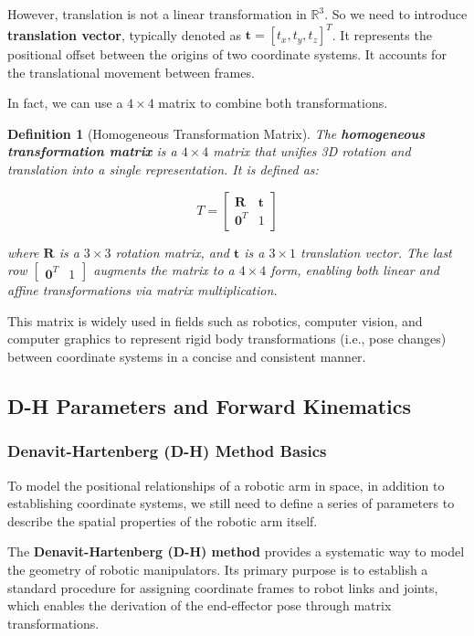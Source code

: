 \documentclass[conference]{IEEEtran}
\newtheorem{definition}{Definition}
\begin{document}
However, translation is not a linear transformation in $\mathbb{R}^3$. So we need to introduce \textbf{translation vector}, typically denoted as $\mathbf{t} = [t_x, t_y, t_z]^T$. It represents the positional offset between the origins of two coordinate systems. It accounts for the translational movement between frames.

In fact, we can use a $4 \times 4$ matrix to combine both transformations.

\begin{definition}[Homogeneous Transformation Matrix]
	The \textbf{homogeneous transformation matrix} is a $4 \times 4$ matrix that unifies 3D rotation and translation into a single representation. It is defined as:
	
	\begin{equation}
		T = \begin{bmatrix}
			\bm{R} & \mathbf{t} \\
			\mathbf{0}^T & 1
		\end{bmatrix}
	\end{equation}
	
	where $\bm{R}$ is a $3 \times 3$ rotation matrix, and $\mathbf{t}$ is a $3 \times 1$ translation vector. The last row $\begin{bmatrix} \mathbf{0}^T & 1 \end{bmatrix}$ augments the matrix to a $4 \times 4$ form, enabling both linear and affine transformations via matrix multiplication.
\end{definition}

This matrix is widely used in fields such as robotics, computer vision, and computer graphics to represent rigid body transformations (i.e., pose changes) between coordinate systems in a concise and consistent manner.

\subsection{D-H Parameters and Forward Kinematics}

\subsubsection{Denavit-Hartenberg (D-H) Method Basics}
To model the positional relationships of a robotic arm in space, in addition to establishing coordinate systems, we still need to define a series of parameters to describe the spatial properties of the robotic arm itself.

The \textbf{Denavit-Hartenberg (D-H) method} provides a systematic way to model the geometry of robotic manipulators. Its primary purpose is to establish a standard procedure for assigning coordinate frames to robot links and joints, which enables the derivation of the end-effector pose through matrix transformations.
\end{document}
